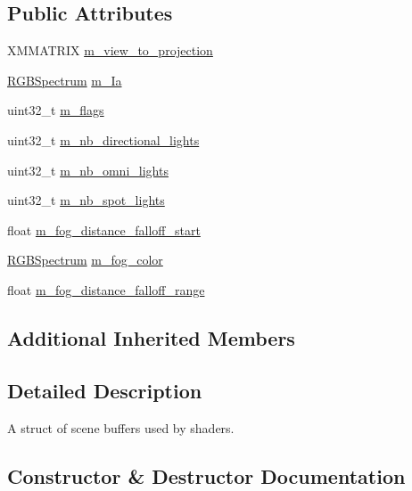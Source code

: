 \subsection*{Public Attributes}
\begin{DoxyCompactItemize}
\item 
X\+M\+M\+A\+T\+R\+IX \hyperlink{structmage_1_1_scene_buffer_ab7028f3a8bd6abbb9a8942c0ea86983a}{m\+\_\+view\+\_\+to\+\_\+projection}
\item 
\hyperlink{structmage_1_1_r_g_b_spectrum}{R\+G\+B\+Spectrum} \hyperlink{structmage_1_1_scene_buffer_aea665fc44e954da899b97ec66e136c06}{m\+\_\+\+Ia}
\item 
uint32\+\_\+t \hyperlink{structmage_1_1_scene_buffer_a1c077575d9bdb7b6300874a12ac7f16e}{m\+\_\+flags}
\item 
uint32\+\_\+t \hyperlink{structmage_1_1_scene_buffer_ae3274b43175f1724c1923f0d5d51dfdf}{m\+\_\+nb\+\_\+directional\+\_\+lights}
\item 
uint32\+\_\+t \hyperlink{structmage_1_1_scene_buffer_a30b77b7124d180c2168c8bc0e84243d3}{m\+\_\+nb\+\_\+omni\+\_\+lights}
\item 
uint32\+\_\+t \hyperlink{structmage_1_1_scene_buffer_a8f46fafa2241a36c7e8060294ee6c4d3}{m\+\_\+nb\+\_\+spot\+\_\+lights}
\item 
float \hyperlink{structmage_1_1_scene_buffer_ae50839fce649b4315d4f89055048559d}{m\+\_\+fog\+\_\+distance\+\_\+falloff\+\_\+start}
\item 
\hyperlink{structmage_1_1_r_g_b_spectrum}{R\+G\+B\+Spectrum} \hyperlink{structmage_1_1_scene_buffer_ab45b78ce0869b32b8540b86606691c5f}{m\+\_\+fog\+\_\+color}
\item 
float \hyperlink{structmage_1_1_scene_buffer_a7c3da84f1ae309bd937f9ef4b3b16cf6}{m\+\_\+fog\+\_\+distance\+\_\+falloff\+\_\+range}
\end{DoxyCompactItemize}
\subsection*{Additional Inherited Members}


\subsection{Detailed Description}
A struct of scene buffers used by shaders. 

\subsection{Constructor \& Destructor Documentation}
\hypertarget{structmage_1_1_scene_buffer_a794ff093bb91a36ca9788ce2db90d140}{}\label{structmage_1_1_scene_buffer_a794ff093bb91a36ca9788ce2db90d140} 

